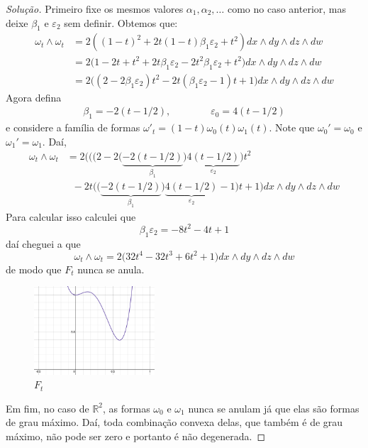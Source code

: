 \begin{proof}[Solução]
Primeiro fixe os mesmos valores $\alpha_1,\alpha_2,\ldots$ como no caso anterior, mas deixe $\beta_1$ e $\varepsilon_2$ sem definir. Obtemos que:
\begin{align*}
\omega_t\wedge \omega_t&=2\left( (1-t)^2+2t(1-t)\beta_1\varepsilon_2+t^2 \right)  dx\wedge dy\wedge dz\wedge dw\\
&=2\Big( 1-2t+t^2+2t\beta_1\varepsilon_2-2t^2\beta_1\varepsilon_2+t^2 \Big)dx\wedge dy\wedge dz\wedge dw\\
&=2\Big((2-2\beta_1\varepsilon_2)t^2-2t(\beta_1\varepsilon_2-1)t+1\Big)dx\wedge dy\wedge dz\wedge dw
\end{align*}
Agora defina
\begin{align*}
	\beta_1=-2(t-1/2),\qquad \qquad \varepsilon_0=4(t-1/2) 
\end{align*}
e considere a família de formas  $\omega'_t=(1-t)\omega_0(t) \omega_1(t)$. Note que $\omega_0'=\omega_0$ e $\omega_1'=\omega_1$. Daí,
\begin{align*}
\omega_t\wedge \omega_t&=2\Bigg(\big((2-2\big(\underbrace{-2(t-1/2)}_{\beta_1}\big)\underbrace{4(t-1/2)}_{\varepsilon_2}\big)t^2\\
&\; \;-2t\Big(\big(\underbrace{-2(t-1/2)}_{\beta_1}\big)\underbrace{4(t-1/2)}_{\varepsilon_2}-1\Big)t+1\Bigg)dx\wedge dy\wedge dz\wedge dw
\end{align*}
Para calcular isso calculei que
\[\beta_1\varepsilon_2=-8t^2-4t+1\]
daí cheguei a que
\[\omega_t\wedge \omega_t=2\big(32t^4-32t^3+6t^2+1\big)dx\wedge dy\wedge dz\wedge dw\]
de modo que $F_t$ nunca se anula.
\begin{figure}[H]
	\centering
	\includegraphics[width=0.4\textwidth]{fig1}
	\caption*{$F_t$}
\end{figure}

Em fim, no caso de $\mathbb{R}^{2}$, as formas $\omega_0$ e $\omega_1$ nunca se anulam já que elas são formas de grau máximo. Daí, toda combinação convexa delas, que também é de grau máximo, não pode ser zero e portanto é não degenerada.
\end{proof}


